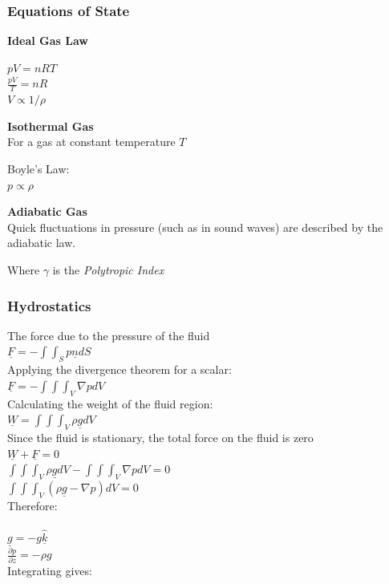 \subsubsection{Equations of State}
\textbf{Ideal Gas Law}
\\
\begin{center}
	$pV =nRT$
	\\
	$\frac{pV}{T} =  nR$
	\\
	$V \propto 1/\rho$
	\\
\end{center}
\textbf{Isothermal Gas}
\\
For a gas at constant temperature $T$
\begin{center}
	Boyle's Law:
	\\
	$p \propto \rho$
	\\
\end{center}
\textbf{Adiabatic Gas}
\\
 Quick fluctuations in pressure (such as in sound waves) are described by the adiabatic law.
 \begin{center}
 \end{center}
Where $\gamma$ is the \textit{Polytropic Index}
\subsubsection{Hydrostatics}
\begin{center}
	The force due to the pressure of the fluid
	\\ 
	$\underline{F} = -\int \int_{S} p \underline{n} dS $
	\\
	Applying the divergence theorem for a scalar:
	\\
	$\underline{F} = - \int\int\int_V \nabla p dV$
	\\
	Calculating the weight of the fluid region:
	\\
	$\underline{W} = \int\int\int_V \rho \underline{g} dV$
	\\
	Since the fluid is stationary, the total force on the fluid is zero
	\\
	$\underline{W} + \underline{F} = 0$
	\\
	$\int\int\int_V \rho \underline{g} dV- \int\int\int_V \nabla p dV = 0$
	\\
	$\int\int\int_V (\rho \underline{g} - \nabla p) dV = 0$
	\\
	Therefore:
	\\
	\\
	$\underline{g} = -g\hat{\underline{k}}$
	\\
	$\frac{\partial p}{\partial z} = -\rho g$
	\\
	Integrating gives:
	\\
\end{center}
